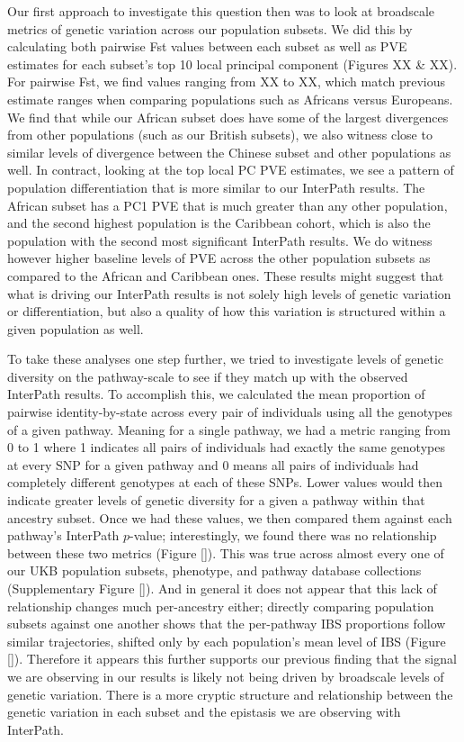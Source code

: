 \documentclass[12pt, a4paper]{article}
\begin{document}
Our first approach to investigate this question then was to look at broadscale metrics of genetic variation across our population subsets. We did this by calculating both pairwise Fst values between each subset as well as PVE estimates for each subset's top 10 local principal component (Figures XX \& XX). For pairwise Fst, we find values ranging from XX to XX, which match previous estimate ranges when comparing populations such as Africans versus Europeans. We find that while our African subset does have some of the largest divergences from other populations (such as our British subsets), we also witness close to similar levels of divergence between the Chinese subset and other populations as well. In contract, looking at the top local PC PVE estimates, we see a pattern of population differentiation that is more similar to our InterPath results. The African subset has a PC1 PVE that is much greater than any other population, and the second highest population is the Caribbean cohort, which is also the population with the second most significant InterPath results. We do witness however higher baseline levels of PVE across the other population subsets as compared to the African and Caribbean ones. These results might suggest that what is driving our InterPath results is not solely high levels of genetic variation or differentiation, but also a quality of how this variation is structured within a given population as well.

To take these analyses one step further, we tried to investigate levels of genetic diversity on the pathway-scale to see if they match up with the observed InterPath results. To accomplish this, we calculated the mean proportion of pairwise identity-by-state across every pair of individuals using all the genotypes of a given pathway. Meaning for a single pathway, we had a metric ranging from 0 to 1 where 1 indicates all pairs of individuals had exactly the same genotypes at every SNP for a given pathway and 0 means all pairs of individuals had completely different genotypes at each of these SNPs. Lower values would then indicate greater levels of genetic diversity for a given a pathway within that ancestry subset. Once we had these values, we then compared them against each pathway's InterPath $p$-value; interestingly, we found there was no relationship between these two metrics (Figure \ref{}). This was true across almost every one of our UKB population subsets, phenotype, and pathway database collections (Supplementary Figure \ref{}). And in general it does not appear that this lack of relationship changes much per-ancestry either; directly comparing population subsets against one another shows that the per-pathway IBS proportions follow similar trajectories, shifted only by each population's mean level of IBS (Figure \ref{}). Therefore it appears this further supports our previous finding that the signal we are observing in our results is likely not being driven by broadscale levels of genetic variation. There is a more cryptic structure and relationship between the genetic variation in each subset and the epistasis we are observing with InterPath. 
\end{document}
